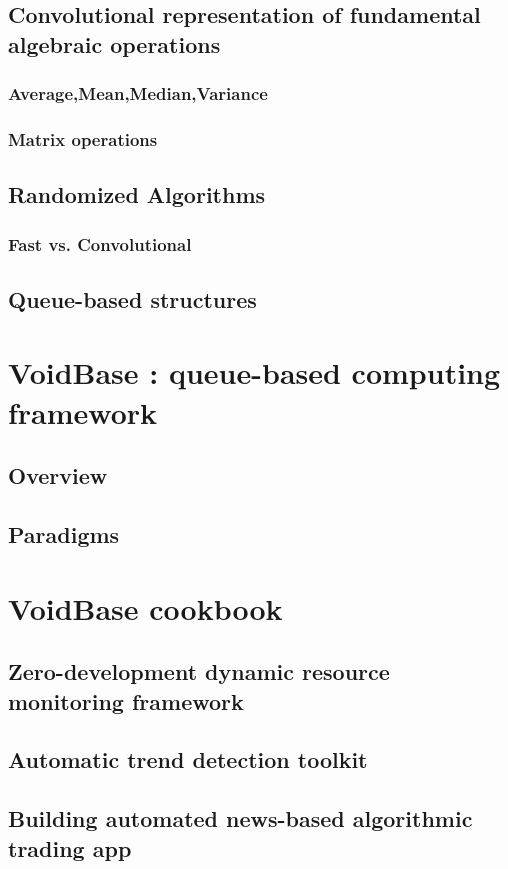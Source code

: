\documentclass[]{book}    %
\begin{document}
\section{Convolutional representation of fundamental algebraic operations}
\subsection{Average,Mean,Median,Variance}
\subsection{Matrix operations}

\section{Randomized Algorithms}
\subsection{Fast vs. Convolutional}
\section{Queue-based structures}

\chapter{VoidBase : queue-based computing framework}
\section{Overview}
\section{Paradigms}

\chapter{VoidBase cookbook}
\section{Zero-development dynamic resource monitoring framework}
\section{Automatic trend detection toolkit}
\section{Building automated news-based algorithmic trading app}
\end{document}
